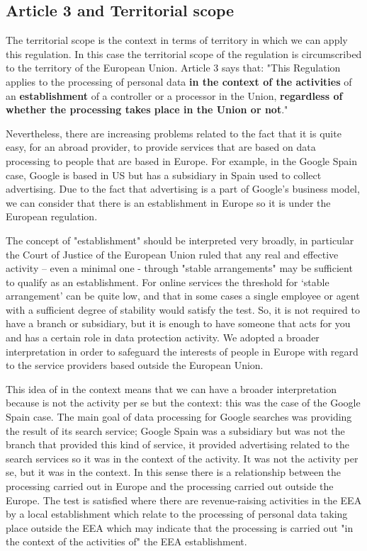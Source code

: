 \subsection{Article 3 and Territorial scope}
The territorial scope is the context in terms of territory in which we can apply this regulation. In this case the territorial scope of the regulation is circumscribed to the territory of the European Union.
Article 3 says that: "This Regulation applies to the processing of personal data \textbf{in the context of the activities} of an \textbf{establishment} of a controller or a processor in the Union, \textbf{regardless of whether the processing takes place in the Union or not}."

Nevertheless, there are increasing problems related to the fact that it is quite easy, for an abroad provider, to provide services that are based on data processing to people that are based in Europe. For example, in the Google Spain case, Google is based in US but has a subsidiary in Spain used to collect advertising. Due to the fact that advertising is a part of Google's business model, we can consider that there is an establishment in Europe so it is under the European regulation.

The concept of "establishment" should be interpreted very broadly, in particular the Court of Justice of the European Union ruled that any real and effective activity – even a minimal one - through "stable arrangements" may be sufficient to qualify as an establishment. For online services the threshold for ‘stable arrangement’ can be quite low, and that in some cases a single employee or agent with a sufficient degree of stability would satisfy the test. So, it is not required to have a branch or subsidiary, but it is enough to have someone that acts for you and has a certain role in data protection activity. We adopted a broader interpretation in order to safeguard the interests of people in Europe with regard to the service providers based outside the European Union.

This idea of in the context means that we can have a broader interpretation because is not the activity per se but the context: this was the case of the Google Spain case. The main goal of data processing for Google searches was providing the result of its search service; Google Spain was a subsidiary but was not the branch that provided this kind of service, it provided advertising related to the search services so it was in the context of the activity. It was not the activity per se, but it was in the context. In this sense there is a relationship between the processing carried out in Europe and the processing carried out outside the Europe.
The test is satisfied where there are revenue-raising activities in the EEA by a local establishment which relate to the processing of personal data taking place outside the EEA which may indicate that the processing is carried out "in the context of the activities of" the EEA establishment. 

